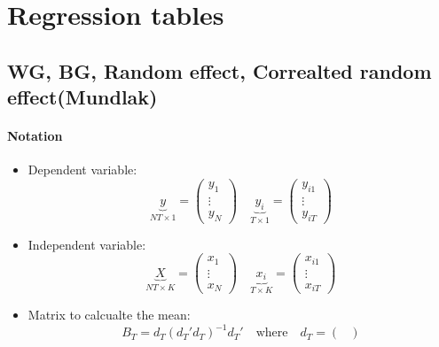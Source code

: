 \newpage
\section{Regression tables}

\subsection{WG, BG, Random effect, Correalted random effect(Mundlak)}
\paragraph{Notation}
\begin{itemize}
    \item Dependent variable: \begin{equation*}
              \underbrace{y}_{NT\times 1}= \begin{pmatrix}
                  y_1    \\
                  \vdots \\
                  y_N
              \end{pmatrix} \quad
              \underbrace{y_i}_{T\times 1} = \begin{pmatrix}
                  y_{i1} \\
                  \vdots \\
                  y_{iT}
              \end{pmatrix}
          \end{equation*}
    \item Independent variable:\begin{equation*}
              \underbrace{X}_{NT\times K}= \begin{pmatrix}
                  x_1    \\
                  \vdots \\
                  x_N
              \end{pmatrix} \quad
              \underbrace{x_i}_{T\times K} = \begin{pmatrix}
                  x_{i1} \\
                  \vdots \\
                  x_{iT}
              \end{pmatrix}
          \end{equation*}
    \item Matrix to calcualte the mean: \begin{equation*}
              B_T= d_T(d_T' d_T)^{-1}d_T'\quad \text{where} \quad d_T=\begin{pmatrix}

\end{pmatrix}
\end{equation*}
\end{itemize}
